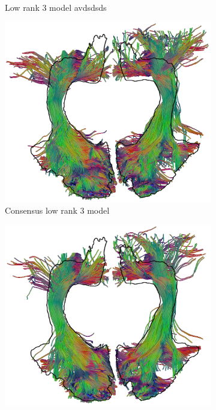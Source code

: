 \begin{figure}
\begin{minipage}{0.24\linewidth}
\begin{subfigure}[b]{\linewidth}
		\caption{Low rank 3 model {\color{white} avdsdsds} }
	\end{subfigure}
	\begin{subfigure}[b]{\linewidth}
		\includegraphics[width=\linewidth]{or-rank-bootstrap-c}
		\caption{Consensus low rank 3 model}
\end{subfigure} 
	\end{minipage} \hfil
	\begin{minipage}{0.24\linewidth}
	\begin{subfigure}[b]{\linewidth}
		\includegraphics[width=\linewidth]{or-avg-c}

\end{subfigure}
\end{minipage}
\end{figure}
